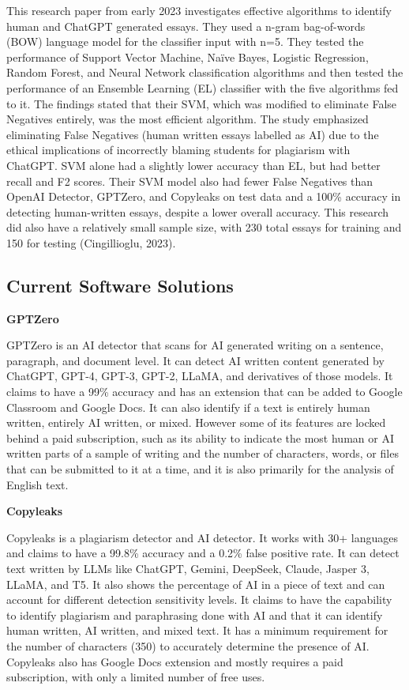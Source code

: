 \documentclass{article} %
\begin{document}
This research paper from early 2023 investigates effective algorithms to identify human and ChatGPT generated essays. They used a n-gram bag-of-words (BOW) language model for the classifier input with n=5. They tested the performance of Support Vector Machine, Naïve Bayes, Logistic Regression, Random Forest, and Neural Network classification algorithms and then tested the performance of an Ensemble Learning (EL) classifier with the five algorithms fed to it. The findings stated that their SVM, which was modified to eliminate False Negatives entirely, was the most efficient algorithm. The study emphasized eliminating False Negatives (human written essays labelled as AI) due to the ethical implications of incorrectly blaming students for plagiarism with ChatGPT. SVM alone had a slightly lower accuracy than EL, but had better recall and F2 scores. Their SVM model also had fewer False Negatives than OpenAI Detector, GPTZero, and Copyleaks on test data and a 100\% accuracy in detecting human-written essays, despite a lower overall accuracy. This research did also have a relatively small sample size, with 230 total essays for training and 150 for testing (Cingillioglu, 2023).

\subsection{Current Software Solutions}

\textbf{GPTZero} ~\citep{GPTZero}

GPTZero is an AI detector that scans for AI generated writing on a sentence, paragraph, and document level. It can detect AI written content generated by ChatGPT, GPT-4, GPT-3, GPT-2, LLaMA, and derivatives of those models. It claims to have a 99\% accuracy and has an extension that can be added to Google Classroom and Google Docs. It can also identify if a text is entirely human written, entirely AI written, or mixed. However some of its features are locked behind a paid subscription, such as its ability to indicate the most human or AI written parts of a sample of writing and the number of characters, words, or files that can be submitted to it at a time, and it is also primarily for the analysis of English text.

\textbf{Copyleaks} \citep{Copyleaks}

Copyleaks is a plagiarism detector and AI detector. It works with 30+ languages and claims to have a 99.8\% accuracy and a 0.2\% false positive rate. It can detect text written by LLMs like ChatGPT, Gemini, DeepSeek, Claude, Jasper 3, LLaMA, and T5. It also shows the percentage of AI in a piece of text and can account for different detection sensitivity levels. It claims to have the capability to identify plagiarism and paraphrasing done with AI and that it can identify human written, AI written, and mixed text. It has a minimum requirement for the number of characters (350) to accurately determine the presence of AI. Copyleaks also has Google Docs extension and mostly requires a paid subscription, with only a limited number of free uses.
\end{document}
